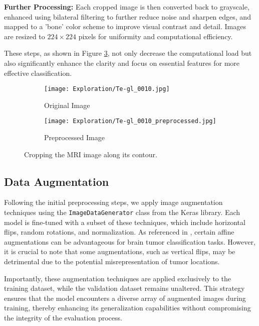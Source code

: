 \textbf{Further Processing:} Each cropped image is then converted back to grayscale, enhanced using bilateral filtering to further reduce noise and sharpen edges, and mapped to a 'bone' color scheme to improve visual contrast and detail. Images are resized to $224 \times 224$
 pixels for uniformity and computational efficiency.

These steps, as shown in Figure \ref{fig:image_cropping}, not only decrease the computational load but also significantly enhance the clarity and focus on essential features for more effective classification.

\begin{figure}[H]
  \centering
  \begin{subfigure}[b]{0.3\textwidth}
    \centering
    \texttt{[image: Exploration/Te-gl\_0010.jpg]}
    \caption{Original Image}
    \label{fig:original_image}
  \end{subfigure}
  \begin{subfigure}[b]{0.3\textwidth}
    \centering
    \texttt{[image: Exploration/Te-gl\_0010\_preprocessed.jpg]}
    \caption{Preprocessed Image}
    \label{fig:preprocessed_image}
  \end{subfigure}
  \caption{Cropping the MRI image along its contour.}\label{fig:image_cropping}
\end{figure}


\subsection{Data Augmentation}\label{data_augmentation}

Following the initial preprocessing steps, we apply image augmentation techniques using the \texttt{ImageDataGenerator} class from the Keras library. Each model is fine-tuned with a subset of these techniques, which include horizontal flips, random rotations, and normalization. As referenced in \cite{nalepa_data_2019}, certain affine augmentations can be advantageous for brain tumor classification tasks. However, it is crucial to note that some augmentations, such as vertical flips, may be detrimental due to the potential misrepresentation of tumor locations.

Importantly, these augmentation techniques are applied exclusively to the training dataset, while the validation dataset remains unaltered. This strategy ensures that the model encounters a diverse array of augmented images during training, thereby enhancing its generalization capabilities without compromising the integrity of the evaluation process.

